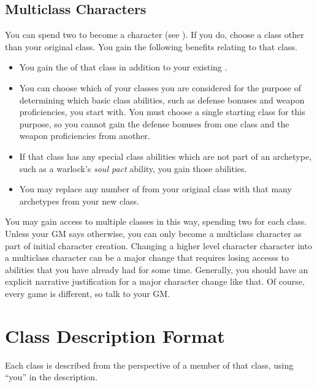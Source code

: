         \subsection{Multiclass Characters}\label{Multiclass Characters}
            You can spend two  to become a  character (see ).
            If you do, choose a class other than your original class.
            You gain the following benefits relating to that class.
            \begin{itemize}
                \item You gain the  of that class in addition to your existing .
                \item You can choose which of your classes you are considered for the purpose of determining which basic class abilities, such as defense bonuses and weapon proficiencies, you start with.
                    You must choose a single starting class for this purpose, so you cannot gain the defense bonuses from one class and the weapon proficiencies from another.
                \item If that class has any special class abilities which are not part of an archetype, such as a warlock's \textit{soul pact} ability, you gain those abilities.
                \item You may replace any number of  from your original class with that many archetypes from your new class.
            \end{itemize}

            You may gain access to multiple classes in this way, spending two  for each class.
            Unless your GM says otherwise, you can only become a multiclass character as part of initial character creation.
            Changing a higher level character character into a multiclass character can be a major change that requires losing accesss to abilities that you have already had for some time.
            Generally, you should have an explicit narrative justification for a major character change like that.
            Of course, every game is different, so talk to your GM.

\section{Class Description Format}
    Each class is described from the perspective of a member of that class, using ``you'' in the description.

